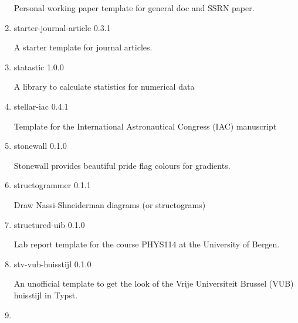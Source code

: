 \begin{enumerate}
  Personal working paper template for general doc and SSRN paper.
\item
  \href{/universe/package/starter-journal-article/}{}


  { starter-journal-article } { 0.3.1 }

  A starter template for journal articles.
\item
  \href{/universe/package/statastic/}{}

  { statastic } { 1.0.0 }

  A library to calculate statistics for numerical data
\item
  \href{/universe/package/stellar-iac/}{}


  { stellar-iac } { 0.4.1 }

  Template for the International Astronautical Congress (IAC) manuscript
\item
  \href{/universe/package/stonewall/}{}

  { stonewall } { 0.1.0 }

  Stonewall provides beautiful pride flag colours for gradients.
\item
  \href{/universe/package/structogrammer/}{}

  { structogrammer } { 0.1.1 }

  Draw Nassi-Shneiderman diagrams (or structograms)
\item
  \href{/universe/package/structured-uib/}{}


  { structured-uib } { 0.1.0 }

  Lab report template for the course PHYS114 at the University of
  Bergen.
\item
  \href{/universe/package/stv-vub-huisstijl/}{}


  { stv-vub-huisstijl } { 0.1.0 }

  An unofficial template to get the look of the Vrije Universiteit
  Brussel (VUB) huisstijl in Typst.
\item
  \href{/universe/package/subpar/}{}


\end{enumerate}
